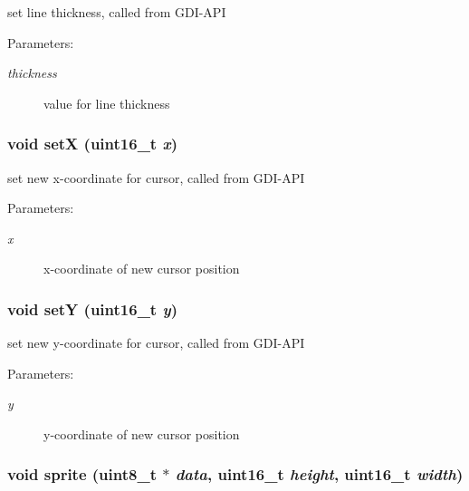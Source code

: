 set line thickness, called from GDI-API 

\begin{Desc}
\item[Parameters:]
\begin{description}
\item[{\em thickness}]value for line thickness \end{description}
\end{Desc}
\hypertarget{group__graphic__device_gba6affc39995efe14043eadbf0b43827}{
\subsubsection[{setX}]{\setlength{\rightskip}{0pt plus 5cm}void setX (uint16\_\-t {\em x})}}
\label{group__graphic__device_gba6affc39995efe14043eadbf0b43827}


set new x-coordinate for cursor, called from GDI-API 

\begin{Desc}
\item[Parameters:]
\begin{description}
\item[{\em x}]x-coordinate of new cursor position \end{description}
\end{Desc}
\hypertarget{group__graphic__device_gebdf36b1cfeae90226306544e8b0f546}{
\subsubsection[{setY}]{\setlength{\rightskip}{0pt plus 5cm}void setY (uint16\_\-t {\em y})}}
\label{group__graphic__device_gebdf36b1cfeae90226306544e8b0f546}


set new y-coordinate for cursor, called from GDI-API 

\begin{Desc}
\item[Parameters:]
\begin{description}
\item[{\em y}]y-coordinate of new cursor position \end{description}
\end{Desc}
\hypertarget{group__graphic__device_g2aea83565e4b3416a0920d9d6d925ed9}{
\subsubsection[{sprite}]{\setlength{\rightskip}{0pt plus 5cm}void sprite (uint8\_\-t $\ast$ {\em data}, \/  uint16\_\-t {\em height}, \/  uint16\_\-t {\em width})}}
\label{group__graphic__device_g2aea83565e4b3416a0920d9d6d925ed9}


